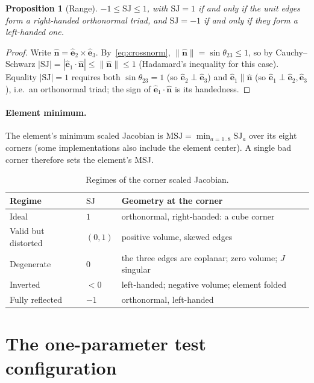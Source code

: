 \documentclass[11pt]{article}
\newtheorem{proposition}{Proposition}
\theoremstyle{definition}
\theoremstyle{remark}
\newcommand{\uv}[1]{\hat{\bm{#1}}}
\newcommand{\SJ}{\mathrm{SJ}}
\begin{document}
\begin{proposition}[Range]\label{prop:SJrange}
$-1\le\SJ\le 1$, with $\SJ=1$ if and only if the unit edges form a right-handed
orthonormal triad, and $\SJ=-1$ if and only if they form a left-handed one.
\end{proposition}
\begin{proof}
Write $\uv{n}=\uv{e}_2\times\uv{e}_3$. By~\eqref{eq:crossnorm},
$\|\uv{n}\|=\sin\theta_{23}\le 1$, so by Cauchy--Schwarz
$|\SJ|=|\uv{e}_1\cdot\uv{n}|\le\|\uv{n}\|\le 1$ (Hadamard's inequality for this case).
Equality $|\SJ|=1$ requires both $\sin\theta_{23}=1$ (so $\uv{e}_2\perp\uv{e}_3$) and
$\uv{e}_1\parallel\uv{n}$ (so $\uv{e}_1\perp\uv{e}_2,\uv{e}_3$), i.e.\ an orthonormal triad;
the sign of $\uv{e}_1\cdot\uv{n}$ is its handedness.
\end{proof}

\paragraph{Element minimum.} The element's minimum scaled Jacobian is
$\mathrm{MSJ}=\min_{a=1..8}\SJ_a$ over its eight corners (some implementations also include
the element center). A single bad corner therefore sets the element's MSJ.

\begin{table}[h]
\centering
\begin{tabular}{@{}lll@{}}
\toprule
Regime & $\SJ$ & Geometry at the corner \\
\midrule
Ideal & $1$ & orthonormal, right-handed: a cube corner \\
Valid but distorted & $(0,1)$ & positive volume, skewed edges \\
Degenerate & $0$ & the three edges are coplanar; zero volume; $J$ singular \\
Inverted & $<0$ & left-handed; negative volume; element folded \\
Fully reflected & $-1$ & orthonormal, left-handed \\
\bottomrule
\end{tabular}
\caption{Regimes of the corner scaled Jacobian.}
\end{table}

\section{The one-parameter test configuration}
\label{sec:config}
\end{document}
